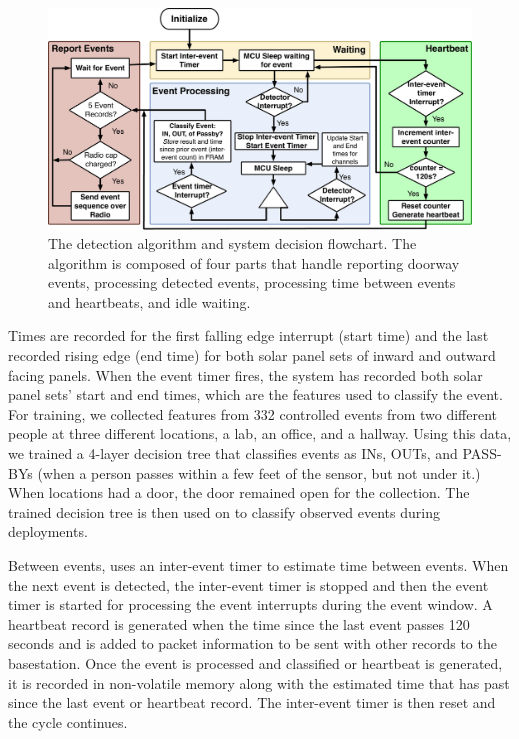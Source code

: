\begin{figure}[t]
\centering
\includegraphics[width=\columnwidth]{figs/software_update.pdf}
\caption{The \sysname detection algorithm and system decision flowchart. The algorithm is composed of four parts that handle reporting doorway events, processing detected events, processing time between events and heartbeats, and idle waiting. \label{fig:software}}
\end{figure}


Times are recorded for the first falling edge interrupt (start time) and the last recorded rising edge (end time) for both solar panel sets of inward and outward facing panels.
When the event timer fires, the system has recorded both solar panel sets' start and end times, which are the features used to classify the event.
For training, we collected features from 332 controlled events from two different people at three different locations, a lab, an office, and a hallway.
Using this data, we trained a 4-layer decision tree that classifies events as INs, OUTs, and PASS-BYs (when a person passes within a few feet of the sensor, but not under it.)
When locations had a door, the door remained open for the collection.  %
The trained decision tree is then used on \sysname to classify observed events during deployments.  


Between events, \sysname uses an inter-event timer to estimate time between events.  
When the next event is detected, the inter-event timer is stopped and then the event timer is started for processing the event interrupts during the event window.
A heartbeat record is generated when the time since the last event passes 120 seconds and is added to packet information to be sent with other records to the basestation. 
Once the event is processed and classified or heartbeat is generated, it is recorded in non-volatile memory along with the estimated time that has past since the last event or heartbeat record.  
The inter-event timer is then reset and the cycle continues.


